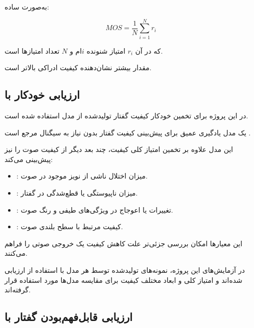 به‌صورت ساده:

\begin{equation}
MOS
=
\frac{1}{N}
\sum_{i=1}^{N} r_i
\end{equation}

که در آن $r_i$ امتیاز شنونده $i$ام و $N$ تعداد امتیازها است.

مقدار بیشتر  نشان‌دهنده کیفیت ادراکی بالاتر است.


\subsection{ارزیابی خودکار با }

در این پروژه برای تخمین خودکار کیفیت گفتار تولیدشده از مدل
استفاده شده است.

یک مدل یادگیری عمیق برای پیش‌بینی کیفیت گفتار بدون نیاز به
سیگنال مرجع است \cite{mittag2021nisqa}.

این مدل علاوه بر تخمین امتیاز کلی کیفیت، چند بعد دیگر از
کیفیت صوت را نیز پیش‌بینی می‌کند:

\begin{itemize}

    \item
    \textbf{}:
    میزان اختلال ناشی از نویز موجود در صوت.

    \item
    \textbf{}:
    میزان ناپیوستگی یا قطع‌شدگی در گفتار.

    \item
    \textbf{}:
    تغییرات یا اعوجاج در ویژگی‌های طیفی و رنگ صوت.

    \item
    \textbf{}:
    کیفیت مرتبط با سطح بلندی صوت.

\end{itemize}

این معیارها امکان بررسی جزئی‌تر علت کاهش کیفیت یک خروجی صوتی
را فراهم می‌کنند.

در آزمایش‌های این پروژه، نمونه‌های تولیدشده توسط هر مدل
 با استفاده از  ارزیابی شده‌اند و امتیاز
کلی و ابعاد مختلف کیفیت برای مقایسه مدل‌ها مورد استفاده قرار
گرفته‌اند.


\subsection{ارزیابی قابل‌فهم‌بودن گفتار با }

